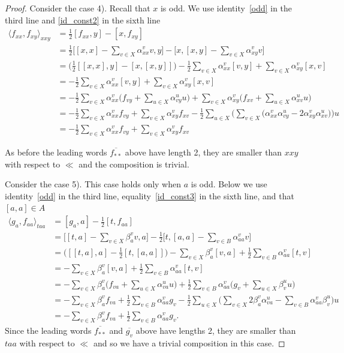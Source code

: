\documentclass[12pt, reqno]{amsart}
\theoremstyle{remark}
\theoremstyle{definition}
\numberwithin{equation}{section}
\begin{document}
\begin{proof}
Consider the case 4). Recall that $x$ is odd. We use identity~\eqref{odd} in the third line
and \eqref{id_const2} in the sixth line  
\begin{align*}
\langle f_{xx}, f_{xy} \rangle_{xxy} &=  \frac{1}{2}[f_{xx},y] - [x, f_{xy}]\\
&=\frac 12\Big [[x,x]-\sum_{v\in X} \alpha^v_{xx}v,y \Big]-\Big[x,[x,y]-\sum_{v\in X}\alpha_{xy}^v v \Big]\\
&=\Big(\frac 12 [[x,x],y]- [x,[x,y]]\Big)
-\frac 12\sum_{v\in X} \alpha^v_{xx}[v,y ]+\sum_{v\in X}\alpha_{xy}^v [x,v] \\
&  = -\frac 12\sum_{v\in X} \alpha^v_{xx}[v,y ]+\sum_{v\in X}\alpha_{xy}^v [x,v]  \\
&=-\frac 12\sum_{v\in X} \alpha^v_{xx}\Big (f_{vy}  + \sum_{u\in X}\alpha^u_{vy} u \Big)
+\sum_{v\in X}\alpha_{xy}^v \Big (f_{xv}  + \sum_{u\in X}\alpha^u_{xv} u \Big) \\
&=-\frac 12\sum_{v\in X} \alpha^v_{xx} f_{vy} +\sum_{v\in X}\alpha_{xy}^v  f_{xv}
 -  \frac 12\sum_{u\in X}\Big( \sum_{v\in X} \Big(\alpha^v_{xx} \alpha^u_{vy}  
-2\alpha_{xy}^v \alpha^u_{xv}\Big)\Big) u  \\
&=-\frac 12\sum_{v\in X} \alpha^v_{xx} f_{vy} +\sum_{v\in X}\alpha_{xy}^v  f_{xv}
\end{align*}
 

As  before the leading words $\overline{f_{**}}$ above have length  2, they are smaller than $xxy$   with respect to $\ll$ and the composition is trivial.

Consider the case 5). This case holds only when $a$ is odd. Below we use identity~\eqref{odd} in the third line,
equality~\eqref{id_const3} in the sixth line, and that $[a,a]\in A$  
\begin{align*}
\langle g_a, f_{aa} \rangle_{taa}& =[g_a, a]- \frac{1}{2}[t, f_{aa}] \\
&=\Big[[t,a] - \sum_{v \in X} \beta_a^v v, a\Big]
  - \frac{1}{2}\Big[t, [a,a]-\sum_{v\in B} \alpha_{aa}^v v\Big] \\
&=\Big ([[t,a],a]-\frac 12[t, [a,a]]\Big) 
   - \sum_{v \in X} \beta_a^v [v, a]
  + \frac{1}{2}\sum_{v\in B} \alpha_{aa}^v [t,v] \\
  &  =  - \sum_{v \in X} \beta_a^v [v, a]
  + \frac{1}{2}\sum_{v\in B} \alpha_{aa}^v [t,v]  \\
&=   - \sum_{v \in X} \beta_a^v \Big(f_{va}  +  \sum_{u\in X}\alpha_{va}^u u \Big)
  + \frac{1}{2}\sum_{v\in B} \alpha_{aa}^v \Big(g_{v}  +  \sum_{u\in X}\beta_{v}^u u \Big)  \\
&=   - \sum_{v \in X} \beta_a^v  f_{va}  + \frac{1}{2}\sum_{v\in B} \alpha_{aa}^v  g_{v}
   - \frac 12\sum_{u\in X}\Big( \sum_{v\in X}2\beta_a^v \alpha_{va}^u  - \sum_{v\in B}\alpha_{aa}^v \beta_{v}^u  \Big)u  \\
&=   - \sum_{v \in X} \beta_a^v  f_{va}  + \frac{1}{2}\sum_{v\in B} \alpha_{aa}^v  g_{v}.
\end{align*}
Since the leading words $\overline{f_{**}}$ and $\overline{g_v}$ above have lengths 2, 
they are smaller than $taa$  with respect to $\ll $ and so we have a trivial composition in this case.
\end{proof}
\end{document}
